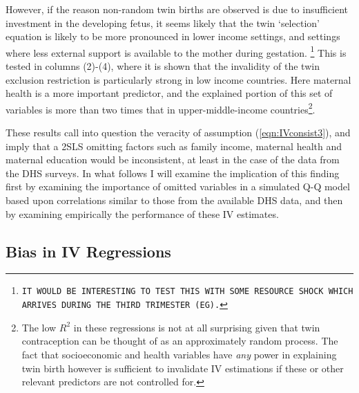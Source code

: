 \documentclass{article}[11pt,subeqn]
\begin{document}
\begin{spacing}{1.5}
However, if the reason non-random twin births are observed is due to insufficient investment in the developing fetus, it seems likely that
the twin `selection' equation is likely to be more pronounced in lower income settings, and settings where less external support is available
to the mother during gestation.  \footnote{\texttt{IT WOULD BE INTERESTING TO TEST THIS WITH SOME RESOURCE SHOCK WHICH ARRIVES DURING
THE THIRD TRIMESTER (EG).}}  This is tested in columns (2)-(4), where it is shown that the invalidity of the twin exclusion restriction is particularly
strong in low income countries.  Here maternal health is a more important predictor, and the explained portion of this set of variables is more than
two times that in upper-middle-income countries\footnote{The low $R^2$ in these regressions is not at all surprising given that twin contraception
can be thought of as an approximately random process.  The fact that socioeconomic and health variables have \emph{any} power in explaining
twin birth however is sufficient to invalidate IV estimations if these or other relevant predictors are not controlled for.}.

These results call into question the veracity of assumption (\ref{eqn:IVconsist3}), and imply that a 2SLS omitting factors such as family
income, maternal health and maternal education would be inconsistent, at least in the case of the data from the DHS surveys.  In what follows
I will examine the implication of this finding first by examining the importance of omitted variables in a simulated Q-Q model based upon
correlations similar to those from the available DHS data, and then by examining empirically the performance of these IV estimates.  
\subsection{Bias in IV Regressions}
\label{scn:bias}

\end{spacing}
\end{document}
